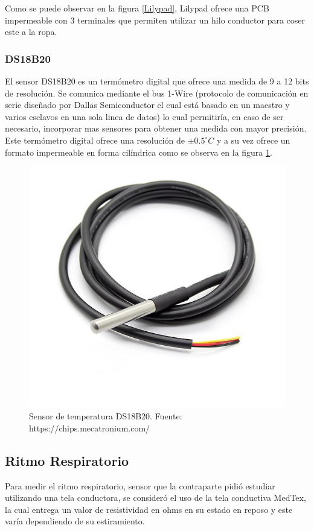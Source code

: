 Como se puede observar en la figura \ref{Lilypad}, Lilypad ofrece una PCB impermeable con 3 terminales que permiten utilizar un hilo conductor para coser este a la ropa.

\subsubsection{DS18B20}
El sensor DS18B20\cite{temp} es un termómetro digital que ofrece una medida de 9 a 12 bits de resolución. Se comunica mediante el bus 1-Wire (protocolo de comunicación en serie diseñado por Dallas Semiconductor el cual está basado en un maestro y varios esclavos en una sola linea de datos) lo cual permitiría, en caso de ser necesario, incorporar mas sensores para obtener una medida con mayor precisión. 
Este termómetro digital ofrece una resolución de $\pm0.5^\circ C$ y a su vez ofrece un formato impermeable en forma cilíndrica como se observa en la figura \ref{DS18B20}.

\begin{figure}[H]
	\centering
	\includegraphics[scale=0.2]{figuras/sensor/t/ds18.jpg}
	\caption{Sensor de temperatura DS18B20. Fuente: https://chips.mecatronium.com/}
	\label{DS18B20}
\end{figure}

\subsection{Ritmo Respiratorio}
Para medir el ritmo respiratorio, sensor que la contraparte pidió estudiar utilizando una tela conductora, se consideró el uso de la tela conductiva MedTex, la cual entrega un valor de resistividad en ohms en su estado en reposo y este varía dependiendo de su estiramiento.\\

